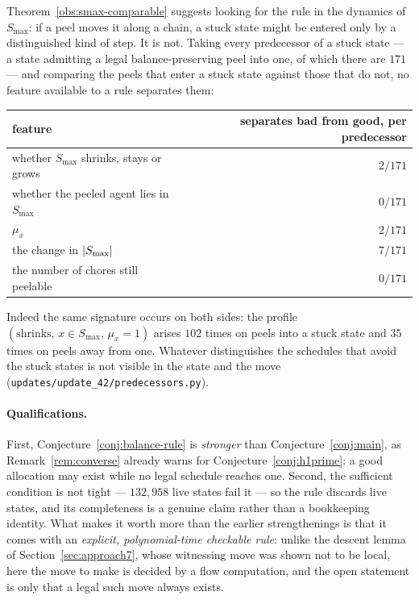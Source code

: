 \begin{remark}
\label{rem:no-separating-feature}
Theorem~\ref{obs:smax-comparable} suggests looking for the rule in the dynamics
of $S_{\max}$: if a peel moves it along a chain, a stuck state might be entered
only by a distinguished kind of step. It is not. Taking every predecessor of a
stuck state --- a state admitting a legal balance-preserving peel into one, of
which there are $171$ --- and comparing the peels that enter a stuck state against
those that do not, no feature available to a rule separates them:
\begin{center}\small
\begin{tabular}{@{}lr@{}}
\toprule
feature & separates bad from good, per predecessor \\
\midrule
whether $S_{\max}$ shrinks, stays or grows & $2 / 171$ \\
whether the peeled agent lies in $S_{\max}$ & $0 / 171$ \\
$\mu_x$ & $2 / 171$ \\
the change in $\left\lvert S_{\max}\right\rvert$ & $7 / 171$ \\
the number of chores still peelable & $0 / 171$ \\
\bottomrule
\end{tabular}
\end{center}
Indeed the same signature occurs on both sides: the profile
$(\text{shrinks},\, x \in S_{\max},\, \mu_x = 1)$ arises $102$ times on peels into
a stuck state and $35$ times on peels away from one. Whatever distinguishes the
schedules that avoid the stuck states is not visible in the state and the move
(\texttt{updates/update\_42/predecessors.py}).
\end{remark}

\paragraph{Qualifications.} First, Conjecture~\ref{conj:balance-rule} is
\emph{stronger} than Conjecture~\ref{conj:main}, as
Remark~\ref{rem:converse} already warns for Conjecture~\ref{conj:h1prime}: a good
allocation may exist while no legal schedule reaches one. Second, the sufficient
condition is not tight --- $132{,}958$ live states fail it --- so the rule
discards live states, and its completeness is a genuine claim rather than a
bookkeeping identity. What makes it worth more than the earlier strengthenings is
that it comes with an \emph{explicit, polynomial-time checkable rule}: unlike the
descent lemma of Section~\ref{sec:approach7}, whose witnessing move was shown not
to be local, here the move to make is decided by a flow computation, and the open
statement is only that a legal such move always exists.

